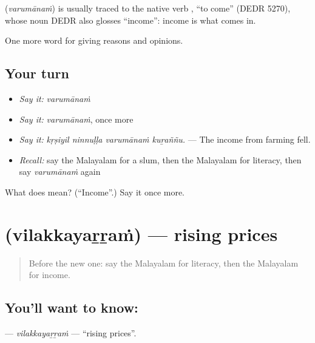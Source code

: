 \begin{cousinweb}
\textbf{} (\emph{varumānaṁ}) is usually traced to the native verb , \textquotedblleft{}to come\textquotedblright{} (DEDR 5270), whose noun  DEDR also glosses \textquotedblleft{}income\textquotedblright{}: income is what comes in.
\end{cousinweb}

\begin{grammarlens}[title={What you've built}]
One more word for giving reasons and opinions.
\end{grammarlens}

\subsection*{Your turn}
\begin{itemize}
\raggedright
  \item \emph{Say it:} \emph{varumānaṁ}
  \item \emph{Say it:} \emph{varumānaṁ}, once more
  \item \emph{Say it:} \emph{kṛṣiyil ninnuḷḷa varumānaṁ kuṟaññu.} — The income from farming fell.
  \item \emph{Recall:} say the Malayalam for a slum, then the Malayalam for literacy, then say \emph{varumānaṁ} again
\end{itemize}

\begin{tcolorbox}[breakable,colback=teal!4,colframe=teal!35!black,title={Before you move on}]
What does  mean? (\textquotedblleft{}Income\textquotedblright{}.) Say it once more.
\end{tcolorbox}
\section[\texorpdfstring{\ml{വിലക്കയറ്റം} (vilakkayaṟṟaṁ)}{വിലക്കയറ്റം (vilakkayaṟṟaṁ)}]{ (vilakkayaṟṟaṁ) — rising prices}

\label{lesson:ML-C428-vilakkayarram}



\begin{quote}
Before the new one: say the Malayalam for literacy, then the Malayalam for income.
\end{quote}

\subsection*{You'll want to know: }
\textbf{} — \emph{vilakkayaṟṟaṁ} — \textquotedblleft{}rising prices\textquotedblright{}.

